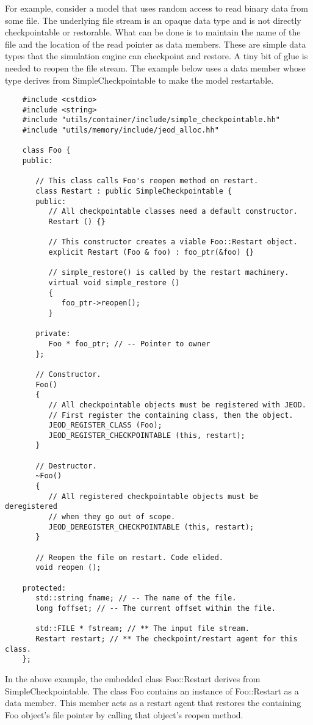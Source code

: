 For example, consider a model that uses random access to read binary data from some file. The underlying file stream is an opaque data type and is not directly
checkpointable or restorable. What can be done is to maintain the name of the
file and the location of the read pointer as data members. These are simple
data types that the simulation engine can checkpoint and restore.
A tiny bit of glue is needed to reopen the file stream. The example below uses a data member whose type derives from SimpleCheckpointable to make
the model restartable.
    \begin{verbatim}
    #include <cstdio>
    #include <string>
    #include "utils/container/include/simple_checkpointable.hh"
    #include "utils/memory/include/jeod_alloc.hh"

    class Foo {
    public:

       // This class calls Foo's reopen method on restart.
       class Restart : public SimpleCheckpointable {
       public:
          // All checkpointable classes need a default constructor.
          Restart () {}
       
          // This constructor creates a viable Foo::Restart object.
          explicit Restart (Foo & foo) : foo_ptr(&foo) {}

          // simple_restore() is called by the restart machinery.
          virtual void simple_restore ()
          {
             foo_ptr->reopen();
          }
          
       private:
          Foo * foo_ptr; // -- Pointer to owner
       };

       // Constructor.
       Foo()
       {
          // All checkpointable objects must be registered with JEOD.
          // First register the containing class, then the object.
          JEOD_REGISTER_CLASS (Foo);
          JEOD_REGISTER_CHECKPOINTABLE (this, restart);
       }
       
       // Destructor.
       ~Foo()
       {
          // All registered checkpointable objects must be deregistered
          // when they go out of scope.
          JEOD_DEREGISTER_CHECKPOINTABLE (this, restart);
       }
       
       // Reopen the file on restart. Code elided.
       void reopen ();

    protected:
       std::string fname; // -- The name of the file.
       long foffset; // -- The current offset within the file.

       std::FILE * fstream; // ** The input file stream.
       Restart restart; // ** The checkpoint/restart agent for this class.
    };
    \end{verbatim}
In the above example, the embedded class Foo::Restart derives from
SimpleCheckpointable. The class Foo contains an instance of Foo::Restart
as a data member. This member acts as a restart agent that restores the
containing Foo object's file pointer by calling that object's reopen method.

